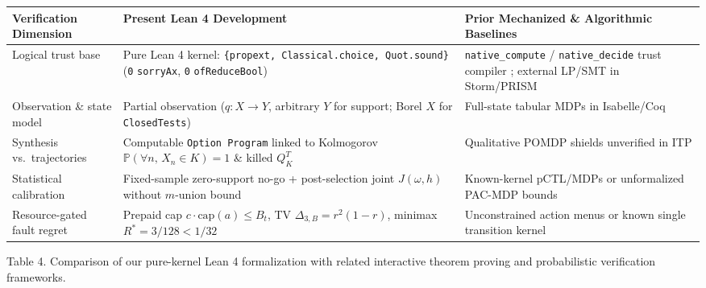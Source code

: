 \documentclass[11pt,a4paper]{article}
\newcounter{none}
\begin{document}
{\def\LTcaptype{none} %
\begin{longtable}[]{@{}
  >{\raggedright\arraybackslash}p{}
  >{\raggedright\arraybackslash}p{}
  >{\raggedright\arraybackslash}p{}@{}}
\toprule\noalign{}
\begin{minipage}[b]{\linewidth}\raggedright
Verification Dimension
\end{minipage} & \begin{minipage}[b]{\linewidth}\raggedright
Present Lean 4 Development
\end{minipage} & \begin{minipage}[b]{\linewidth}\raggedright
Prior Mechanized \& Algorithmic Baselines
\end{minipage} \\
\midrule\noalign{}
\endhead
\bottomrule\noalign{}
\endlastfoot
Logical trust base & Pure Lean 4 kernel:
\texttt{\{propext,\ Classical.choice,\ Quot.sound\}} (\texttt{0}
\texttt{sorryAx}, \texttt{0} \texttt{ofReduceBool}) &
\texttt{native\_compute} / \texttt{native\_decide} trust compiler
\citep{boespflug2011}; external LP/SMT in Storm/PRISM
\citep{kwiatkowska2011, dehnert2017} \\
Observation \& state model & Partial observation (\(q: X \to Y\),
arbitrary \(Y\) for support; Borel \(X\) for \texttt{ClosedTests}) &
Full-state tabular MDPs in Isabelle/Coq
\citep{hoelzl2017, vajjha2021, schaeffelerAbdulaziz2023} \\
Synthesis vs.~trajectories & Computable \texttt{Option\ Program} linked
to Kolmogorov \(\mathbb{P}(\forall n,\, X_n \in K)=1\) \& killed
\(Q_K^T\) & Qualitative POMDP shields unverified in ITP
\citep{chatterjee2016, alshiekh2018, junges2021} \\
Statistical calibration & Fixed-sample zero-support no-go +
post-selection joint \(J(\omega,h)\) without \(m\)-union bound &
Known-kernel pCTL/MDPs \citep{hoelzlNipkow2012} or unformalized PAC-MDP
bounds \citep{strehl2009} \\
Resource-gated fault regret & Prepaid cap
\(c\cdot\mathrm{cap}(a)\le B_t\), TV \(\Delta_{3,B}=r^2(1-r)\), minimax
\(R^*=3/128 < 1/32\) & Unconstrained action menus or known single
transition kernel \\
\end{longtable}
}

Table 4. Comparison of our pure-kernel Lean 4 formalization with related
interactive theorem proving and probabilistic verification frameworks.
\end{document}
